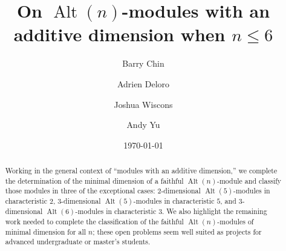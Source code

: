 \documentclass[a4paper, 11pt]{amsart}
\theoremstyle{plain}
\theoremstyle{definition}
\theoremstyle{remark}
\DeclareMathOperator{\Alt}{Alt}
\begin{document}
\title[On $\Alt(n)$-modules when $n\le6$]{On $\Alt(n)$-modules with an additive dimension when $n\le6$}
\author{Barry Chin}
\author{Adrien Deloro}
\address{Sorbonne Universit\'e and Universit\'e de Paris, \textsc{cnrs}, \textsc{imj-prg}, F-75005 Paris, France}
\author{Joshua Wiscons}
\address{Department of Mathematics and Statistics\\
California State University, Sacramento\\
Sacramento, CA 95819, USA}
\author{Andy Yu}
\address{Department of Mathematics and Statistics\\
California State University, Sacramento\\
Sacramento, CA 95819, USA}

\date{\today}

\begin{abstract}
    Working in the general context of ``modules with an additive dimension,'' we complete the determination of the minimal dimension of a faithful $\Alt(n)$-module and classify those modules in three of the exceptional cases:  $2$-dimensional $\Alt(5)$-modules in characteristic $2$, $3$-dimensional $\Alt(5)$-modules in characteristic $5$, and $3$-dimensional $\Alt(6)$-modules in characteristic $3$. We also highlight the remaining work needed to complete the classification of the faithful $\Alt(n)$-modules of minimal dimension for all $n$; these open problems seem well suited as projects for advanced undergraduate or master's students. 
\end{abstract}

\maketitle


\end{document}
